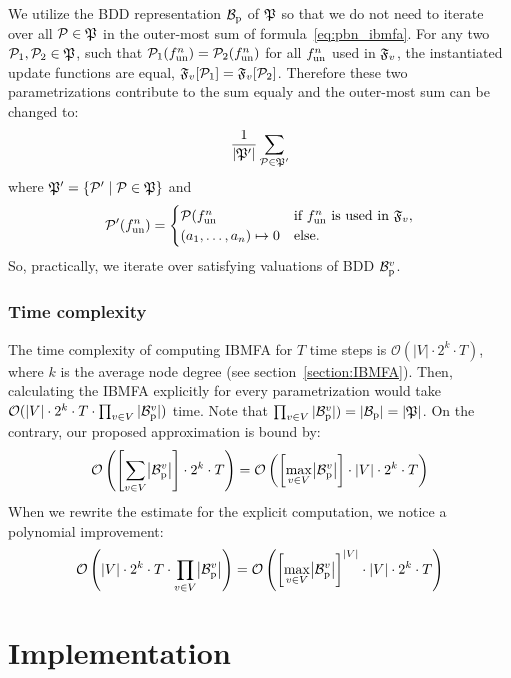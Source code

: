 \documentclass[
	digital, oneside, nosansbold, nocolorbold, nolot, nolof
]{fithesis4}
\theoremstyle{definition}
\theoremstyle{definition}
\DeclarePairedDelimiter{\set}{\{}{\}}
\DeclarePairedDelimiter{\card}{|}{|}
\begin{document}
We utilize the BDD representation $\mathcal{B}_{\text{p}}$ of $\mathfrak{P}$ so that we do
not need to iterate over all $\mathcal{P} \in \mathfrak{P}$ in the outer-most
sum of formula~\ref{eq:pbn_ibmfa}. For any two $\mathcal{P}_1, \mathcal{P}_2 \in
\mathfrak{P}$, such that $\mathcal{P}_1(f_{\textrm{un}}^n) = \mathcal{P}_2(f_{\textrm{un}}^n)$ for
all $f_{\textrm{un}}^n$ used in $\mathfrak{F}_v$, the instantiated update functions
are equal, $\mathfrak{F}_v[\mathcal{P}_1] = \mathfrak{F}_v[\mathcal{P}_2]$. Therefore
these two parametrizations contribute to the sum equaly and the outer-most
sum can be changed to:
\[
    \frac{1}{|\mathfrak{P}'|} \sum_{\mathcal{P} \in \mathfrak{P}'}
\]
where $\paronset{P}' = \set{\paron{P}' \mid \paron{P} \in \paronset{P}}$ and
\[
    \mathcal{P}'(f_{\textrm{un}}^n) =
        \begin{cases}
            \mathcal{P}(f_{\textrm{un}}^n &
                \text{if } f_{\textrm{un}}^n \text{ is used in } \mathfrak{F}_v,\\
            (a_1, \ldots, a_n) \mapsto 0 & \text{else}.
        \end{cases}
\]
So, practically, we iterate over satisfying valuations of BDD $\mathcal{B}_{\text{p}}^v$.

\subsection{Time complexity}

The time complexity of computing IBMFA for $T$ time steps is $\mathcal{O}(|V|
\cdot 2^k \cdot T)$, where $k$ is the average node degree (see section~\ref{section:IBMFA}).
Then, calculating the IBMFA explicitly for every parametrization would take
$\mathcal{O}(|V| \cdot 2^k \cdot T \cdot \prod_{v \in V} |\mathcal{B}_{\text{p}}^v|)$
time. Note that $\prod_{v \in V} |\mathcal{B}_{\text{p}}^v|) = |\mathcal{B}_{\text{p}}| =
|\mathfrak{P}|$. On the contrary, our proposed approximation is bound by:
\[
\mathcal{O}\left(\left[\sum_{v \in V} \card*{\bddp{B}^v}\right]
    \cdot 2^k \cdot T\right)
= \mathcal{O}\left(\left[\max_{v \in V} \card*{\bddp{B}^v}\right]
    \cdot |V| \cdot 2^k \cdot T \right)
\]
When we rewrite the estimate for the explicit computation, we notice
a polynomial improvement:
\[
\mathcal{O}\left(|V| \cdot 2^k \cdot T \cdot
    \prod_{v \in V} \card*{\bddp{B}^v}\right)
= \mathcal{O}\left(\left[\max_{v \in V} \card*{\bddp{B}^v}\right]^{|V|}
    \cdot |V| \cdot 2^k \cdot T\right)
\]


\chapter{Implementation}
\end{document}
